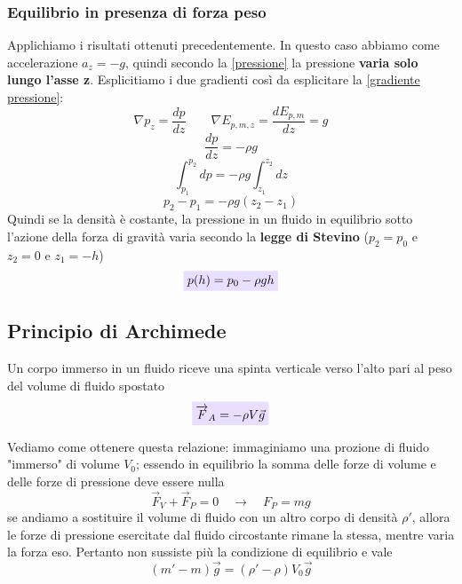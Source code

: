 \documentclass[x11names]{article}
\newcommand{\viola}[1]{\colorbox{yred}{$\displaystyle #1$}}
\begin{document}
	\subsubsection{Equilibrio in presenza di forza peso}
	Applichiamo i risultati ottenuti precedentemente. In questo caso abbiamo come accelerazione \(a_z = -g\), quindi secondo la \ref{pressione} la pressione \textbf{varia solo lungo l'asse z}. Esplicitiamo i due gradienti così da esplicitare la \ref{gradiente pressione}:
	\[ 
	\boxed{\nabla p_z = \frac{d p}{d z} }\qquad \boxed{\nabla E_{p,m,z} = \frac{d E_{p,m}}{d z} = g}
	\]
	\[ 
	\frac{dp}{dz} = -\rho g
	\]
	\[ 
	\int_{p_1}^{p_2}dp = -\rho g \int_{z_1}^{z_2}dz
	\]
	\[ 
	p_2 - p_1 = -\rho g (z_2 - z_1)
	\]
	Quindi se la densità è costante, la pressione in un fluido in equilibrio sotto l'azione della forza di gravità varia secondo la \textbf{legge di Stevino }(\(p_2 = p_0\) e \(z_2 = 0\) e \(z_1 = -h\))
	\begin{equation}\label{stevino}
		\viola{ p(h) = p_0 -\rho g h}
	\end{equation}
	
	\subsection{Principio di Archimede}
	Un corpo immerso in un fluido riceve una spinta verticale verso l'alto  pari al peso del volume di fluido spostato
	\begin{equation}
	\viola{	\overrightarrow{F}_A = -\rho V \vec{g}}
	\end{equation}
	

	
	Vediamo come ottenere questa relazione: immaginiamo una prozione di fluido "immerso" di volume \(V_{0}\); essendo in equilibrio la somma delle forze di volume e delle forze di pressione deve essere nulla
	\[ 
	\overrightarrow{F}_{V} + \overrightarrow{F}_{P} = 0 \quad \to \quad F_{P} = mg
	\]
	se andiamo a sostituire il volume di fluido con un altro corpo di densità \(\rho'\), allora le forze di pressione esercitate dal fluido circostante rimane la stessa, mentre varia la forza eso. Pertanto non sussiste più la condizione di equilibrio e vale
	\[ 
	(m' - m)\vec{g} = (\rho'-\rho)V_{0}\vec{g}
	\]
	
\end{document}
